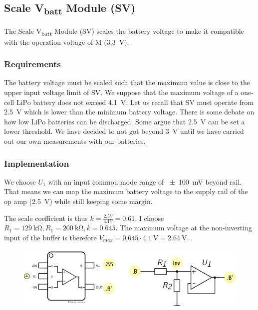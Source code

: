 \subsection{Scale V\textsubscript{batt}  Module (SV) }
\label{sec:SV}

The Scale V\textsubscript{batt} Module (SV) scales the battery voltage to make it compatible with
the operation voltage of  \mu M (\SI{3.3}{\volt}).


\subsubsection{Requirements}

The battery voltage   must be scaled such that the maximum value is close to
the upper input voltage limit of SV.
We suppose that the maximum voltage of a one-cell LiPo battery does not exceed  \SI{4.1}{\V}.
Let us recall that SV must operate from \SI{2.5}{\volt} which is lower than the minimum battery voltage.
There is some debate on how low LiPo batteries can be discharged. Some argue that \SI{2.5}{\V}
can be set a lower threshold. We have decided to not got beyond \SI{3}{\V}
until we have carried out our own measurements with our
batteries.



\subsubsection{Implementation}
\label{sss:svi}

We choose $U_1$ with an input common mode range of \SI{\pm100}{\milli\volt} beyond rail.
That means we can map the maximum battery voltage
to the supply rail of the op amp (\SI{2.5}{\volt}) while still keeping some margin. \par


The scale coefficient is thus $k = \frac{\si{2.5}{V}}{\si{4.1}{V}} = 0.61$.
I choose $R_1 = \SI{129}{\kilo\ohm}, R_1 = \SI{200}{\kilo\ohm}, k = 0.645$.
The maximum voltage at the non-inverting input of the buffer is therefore
$V_{max} = 0.645 \cdot\SI{4.1}{\V}  = \SI{2.64}{\V}$.

\par

\begin{figure}[h]
    \centering
    \includegraphics[width=1.0\textwidth]{PO/SV/SV}
\end{figure}



